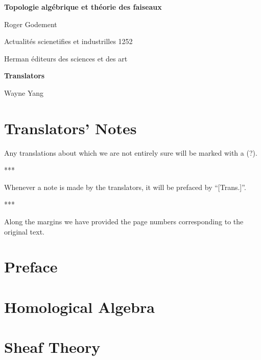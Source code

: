 \documentclass[openany,oneside]{amsbook}
\theoremstyle{ega-env-style}
\theoremstyle{ega-thm-env-style}
\theoremstyle{ega-defn-env-style}
\def\unsure#1{#1 {\color{red}(?)}}
\newcommand{\oldpage}[1][--]{{\marginnote{\normalfont{\textbf{#1}}}}\ignorespaces}
\def\sectionbreak{\begin{center}***\end{center}}
\begin{document}
\begin{titlepage}
\pagestyle{empty}
\setcounter{page}{1}
\centerline{\LARGE\bfseries Topologie alg\'ebrique et th\'eorie des faiseaux}
\vskip0.5in
\noindent
\centerline{Roger Godement}
\centerline{Actualit\'es scienetifies et industrilles 1252}
\centerline{Herman \'editeurs des sciences et des art}
\vskip0.5in
\noindent
\centerline{\bfseries Translators}
\centerline{Wayne Yang}
\end{titlepage}
\setcounter{tocdepth}{2}
\tableofcontents

\label{section:Trasnote}
\chapter*{Translators' Notes}

\unsure{Any translations about which we are not entirely sure will be marked with a}.

\sectionbreak

Whenever a note is made by the translators, it will be prefaced by ``[Trans.]''.

\sectionbreak

Along the margins we have provided the page numbers corresponding to the original text.

\chapter*{Preface}

\label{section:preface}

\oldpage[I]

\chapter{Homological Algebra}

\label{section:tatf1}


\chapter{Sheaf Theory}

\label{section:tatf2}




\end{document}
